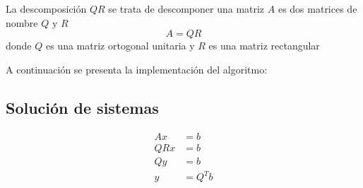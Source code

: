 La descomposición $QR$ se trata de descomponer una matriz $A$ es dos matrices de nombre $Q$ y $R$
\[
A=QR
\] 
donde $Q$ es una matriz ortogonal unitaria y  $R$ es una matriz rectangular

A continuación se presenta la implementación del algoritmo:



\subsection{Solución de sistemas}
\begin{align*}
	Ax&=b\\
	QRx&=b\\
	Qy&=b\\
	y&=Q^{T}b
\end{align*}
